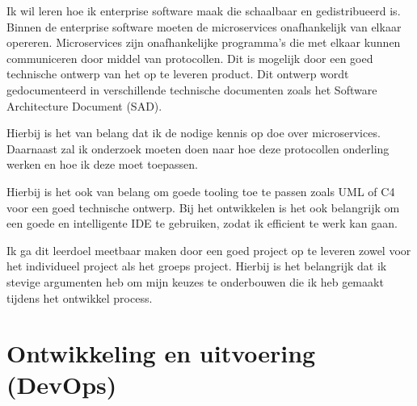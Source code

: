 Ik wil leren hoe ik enterprise software maak die schaalbaar en gedistribueerd is.
Binnen de enterprise software moeten de microservices onafhankelijk van elkaar opereren.
Microservices zijn onafhankelijke programma's die met elkaar kunnen communiceren door middel van protocollen.
Dit is mogelijk door een goed technische ontwerp van het op te leveren product.
Dit ontwerp wordt gedocumenteerd in verschillende technische documenten zoals het Software Architecture Document (SAD).

Hierbij is het van belang dat ik de nodige kennis op doe over microservices.
Daarnaast zal ik onderzoek moeten doen naar hoe deze protocollen onderling werken en hoe ik deze moet toepassen.

Hierbij is het ook van belang om goede tooling toe te passen zoals UML of C4 voor een goed technische ontwerp.
Bij het ontwikkelen is het ook belangrijk om een goede en intelligente IDE te gebruiken, zodat ik efficient te werk
kan gaan.

Ik ga dit leerdoel meetbaar maken door een goed project op te leveren zowel voor het individueel project als het
groeps project.
Hierbij is het belangrijk dat ik stevige argumenten heb om mijn keuzes te onderbouwen die ik heb gemaakt tijdens
het ontwikkel process.











\newpage
\section{Ontwikkeling en uitvoering (DevOps)}\label{sec:ontwikkeling-en-uitvoering-(devops)}


